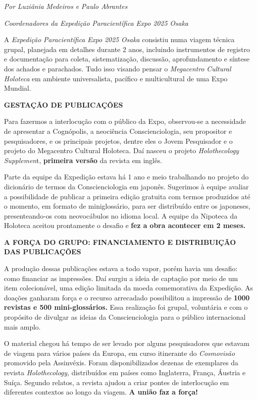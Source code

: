 \documentclass[
]{article}
\begin{document}
\emph{Por Luziânia Medeiros e Paulo Abrantes}

\emph{Coordenadores da Expedição Paracientífica Expo 2025 Osaka}

A \emph{Expedição Paracientífica Expo 2025 Osaka} consistiu numa viagem técnica grupal, planejada em detalhes durante 2 anos, incluindo instrumentos de registro e documentação para coleta, sistematização, discussão, aprofundamento e síntese dos achados e parachados. Tudo isso visando pensar o \emph{Megacentro Cultural Holoteca} em ambiente universalista, pacífico e multicultural de uma Expo Mundial.

\textbf{GESTAÇÃO DE PUBLICAÇÕES}

Para fazermos a interlocução com o público da Expo, observou-se a necessidade de apresentar a Cognópolis, a neociência Conscienciologia, seu propositor e pesquisadores, e os principais projetos, dentre eles o Jovem Pesquisador e o projeto do Megacentro Cultural Holoteca. Daí nasceu o projeto \emph{Holothecology Supplemen}t, \textbf{primeira versão} da revista em inglês.

Parte da equipe da Expedição estava há 1 ano e meio trabalhando no projeto do dicionário de termos da Conscienciologia em japonês. Sugerimos à equipe avaliar a possibilidade de publicar a primeira edição gratuita com termos produzidos até o momento, em formato de miniglossário, para ser distribuído entre os japoneses, presenteando-os com neovocábulos no idioma local. A equipe da Nipoteca da Holoteca aceitou prontamente o desafio e \textbf{fez a obra acontecer em 2 meses.}

\textbf{A FORÇA DO GRUPO: FINANCIAMENTO E DISTRIBUIÇÃO DAS PUBLICAÇÕES}

A produção dessas publicações estava a todo vapor, porém havia um desafio: como financiar as impressões. Daí surgiu a ideia de captação por meio de um item colecionável, uma edição limitada da moeda comemorativa da Expedição. As doações ganharam força e o recurso arrecadado possibilitou a impressão de \textbf{1000 revistas e 500 mini-glossários.} Essa realização foi grupal, voluntária e com o propósito de divulgar as ideias da Conscienciologia para o público internacional mais amplo.

O material chegou há tempo de ser levado por alguns pesquisadores que estavam de viagem para vários países da Europa, em curso itinerante do \emph{Cosmovisão} promovido pela Assinvéxis. Foram disponibilizados dezenas de exemplares da revista \emph{Holothecology,} distribuídos em países como Inglaterra, França, Áustria e Suíça. Segundo relatos, a revista ajudou a criar pontes de interlocução em diferentes contextos ao longo da viagem. \textbf{A união faz a força!}
\end{document}
